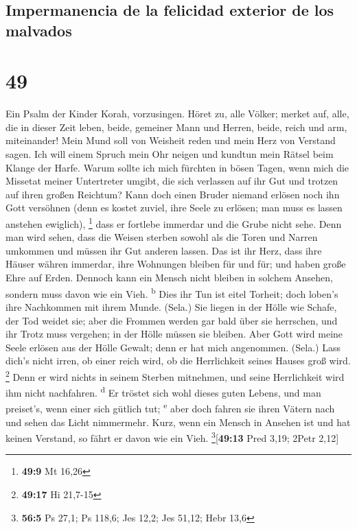 \hypertarget{impermanencia-de-la-felicidad-exterior-de-los-malvados}{%
\subsection{Impermanencia de la felicidad exterior de los
malvados}\label{impermanencia-de-la-felicidad-exterior-de-los-malvados}}

\hypertarget{section-48}{%
\section{49}\label{section-48}}

 Ein Psalm der Kinder Korah, vorzusingen. 
Höret zu, alle Völker; merket auf, alle, die in dieser Zeit leben,
 beide, gemeiner Mann und Herren, beide, reich und arm,
miteinander!  Mein Mund soll von Weisheit reden und mein
Herz von Verstand sagen.  Ich will einem Spruch mein Ohr
neigen und kundtun mein Rätsel beim Klange der Harfe. 
Warum sollte ich mich fürchten in bösen Tagen, wenn mich die Missetat
meiner Untertreter umgibt,  die sich verlassen auf ihr Gut
und trotzen auf ihren großen Reichtum?  Kann doch einen
Bruder niemand erlösen noch ihn Gott versöhnen  (denn es
kostet zuviel, ihre Seele zu erlösen; man muss es lassen anstehen
ewiglich), \footnote{\textbf{49:9} Mt 16,26}  dass er
fortlebe immerdar und die Grube nicht sehe.  Denn man
wird sehen, dass die Weisen sterben sowohl als die Toren und Narren
umkommen und müssen ihr Gut anderen lassen.  Das ist ihr
Herz, dass ihre Häuser währen immerdar, ihre Wohnungen bleiben für und
für; und haben große Ehre auf Erden.  Dennoch kann ein
Mensch nicht bleiben in solchem Ansehen, sondern muss davon wie ein
Vieh. \textsuperscript{b}  Dies ihr Tun ist eitel
Torheit; doch loben's ihre Nachkommen mit ihrem Munde. (Sela.)
 Sie liegen in der Hölle wie Schafe, der Tod weidet sie;
aber die Frommen werden gar bald über sie herrschen, und ihr Trotz muss
vergehen; in der Hölle müssen sie bleiben.  Aber Gott
wird meine Seele erlösen aus der Hölle Gewalt; denn er hat mich
angenommen. (Sela.)  Lass dich's nicht irren, ob einer
reich wird, ob die Herrlichkeit seines Hauses groß wird. \footnote{\textbf{49:17}
  Hi 21,7-15}  Denn er wird nichts in seinem Sterben
mitnehmen, und seine Herrlichkeit wird ihm nicht nachfahren.
\textsuperscript{d}  Er tröstet sich wohl dieses guten
Lebens, und man preiset's, wenn einer sich gütlich tut;
\textsuperscript{e}  aber doch fahren sie ihren Vätern
nach und sehen das Licht nimmermehr.  Kurz, wenn ein
Mensch in Ansehen ist und hat keinen Verstand, so fährt er davon wie ein
Vieh. \footnote{\textbf{56:5} Ps 27,1; Ps 118,6; Jes 12,2; Jes 51,12;
  Hebr 13,6}{[}\textbf{49:13} Pred 3,19; 2Petr 2,12{]}

